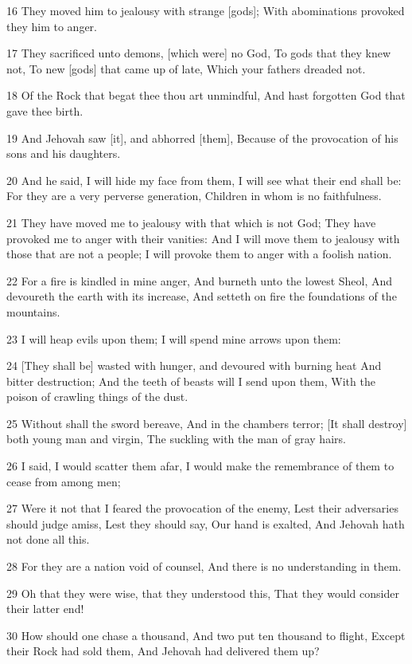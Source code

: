 \par 16 They moved him to jealousy with strange [gods]; With abominations provoked they him to anger.
\par 17 They sacrificed unto demons, [which were] no God, To gods that they knew not, To new [gods] that came up of late, Which your fathers dreaded not.
\par 18 Of the Rock that begat thee thou art unmindful, And hast forgotten God that gave thee birth.
\par 19 And Jehovah saw [it], and abhorred [them], Because of the provocation of his sons and his daughters.
\par 20 And he said, I will hide my face from them, I will see what their end shall be: For they are a very perverse generation, Children in whom is no faithfulness.
\par 21 They have moved me to jealousy with that which is not God; They have provoked me to anger with their vanities: And I will move them to jealousy with those that are not a people; I will provoke them to anger with a foolish nation.
\par 22 For a fire is kindled in mine anger, And burneth unto the lowest Sheol, And devoureth the earth with its increase, And setteth on fire the foundations of the mountains.
\par 23 I will heap evils upon them; I will spend mine arrows upon them:
\par 24 [They shall be] wasted with hunger, and devoured with burning heat And bitter destruction; And the teeth of beasts will I send upon them, With the poison of crawling things of the dust.
\par 25 Without shall the sword bereave, And in the chambers terror; [It shall destroy] both young man and virgin, The suckling with the man of gray hairs.
\par 26 I said, I would scatter them afar, I would make the remembrance of them to cease from among men;
\par 27 Were it not that I feared the provocation of the enemy, Lest their adversaries should judge amiss, Lest they should say, Our hand is exalted, And Jehovah hath not done all this.
\par 28 For they are a nation void of counsel, And there is no understanding in them.
\par 29 Oh that they were wise, that they understood this, That they would consider their latter end!
\par 30 How should one chase a thousand, And two put ten thousand to flight, Except their Rock had sold them, And Jehovah had delivered them up?
